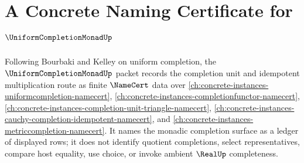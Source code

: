 \chapter{A Concrete Naming Certificate for $\UniformCompletionMonadUp$}
\label{ch:concrete-instances-uniform-completion-monad-namecert}

Following Bourbaki and Kelley on uniform completion, the $\UniformCompletionMonadUp$ packet records the completion unit and idempotent multiplication route as finite $\NameCert$ data over \autoref{ch:concrete-instances-uniformcompletion-namecert}, \autoref{ch:concrete-instances-completionfunctor-namecert}, \autoref{ch:concrete-instances-completion-unit-triangle-namecert}, \autoref{ch:concrete-instances-cauchy-completion-idempotent-namecert}, and \autoref{ch:concrete-instances-metriccompletion-namecert}. It names the monadic completion surface as a ledger of displayed rows; it does not identify quotient completions, select representatives, compare host equality, use choice, or invoke ambient $\RealUp$ completeness.

